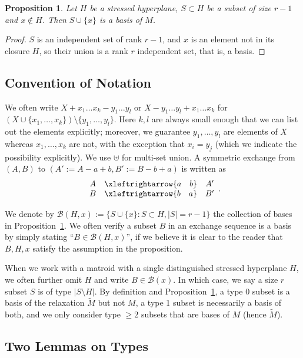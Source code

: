 \documentclass{amsart}
\newtheorem{proposition}[theorem]{Proposition}
\newcommand{\swap}[2]{\xleftrightarrow{#1 \quad #2}}
\newcommand\Bcal{{\mathcal B}}
\begin{document}
\begin{proposition} \label{prop:type1}
    Let $H$ be a stressed hyperplane, $S\subset H$ be a subset of size $r-1$ and $x\not\in H$. Then $S\cup \{x\}$ is a basis of $M$.
\end{proposition}

\begin{proof}
    $S$ is an independent set of rank $r-1$, and $x$ is an element not in its closure $H$, so their union is a rank $r$ independent set, that is, a basis.
\end{proof}

\subsection{Convention of Notation}

We often write $X+ x_1\ldots x_k-y_1\ldots y_l$ or $X-y_1\ldots y_l+x_1\ldots x_k$ for $(X\cup\{x_1,\ldots,x_k\})\setminus\{y_1,\ldots,y_l\}$. Here $k,l$ are always small enough that we can list out the elements explicitly; moreover, we guarantee $y_1,\ldots,y_l$ are elements of $X$ whereas $x_1,\ldots,x_k$ are not, with the exception that $x_i=y_j$ (which we indicate the possibility explicitly). We use $\uplus$ for multi-set union.
A symmetric exchange from $(A,B)$ to $(A':=A-a+b,B':=B-b+a)$ is written as
$$
\begin{array}{c c c}
   A   & \swap{a}{b} & A'\\
   B   & \swap{b}{a} & B'
\end{array}.
$$

We denote by $\Bcal(H,x):=\{S\cup\{x\}:S\subset H, |S|=r-1\}$ the collection of bases in Proposition~\ref{prop:type1}. We often verify a subset $B$ in an exchange sequence is a basis by simply stating ``$B\in\Bcal(H,x)$'', if we believe it is clear to the reader that $B,H,x$ satisfy the assumption in the proposition.

When we work with a matroid with a single distinguished stressed hyperplane $H$, we often further omit $H$ and write $B\in\Bcal(x)$. In which case, we say a size $r$ subset $S$ is of type $|S\setminus H|$. By definition and Proposition~\ref{prop:type1}, a type 0 subset is a basis of the relaxation $\widetilde{M}$ but not $M$, a type 1 subset is necessarily a basis of both, and we only consider type $\geq 2$ subsets that are bases of $M$ (hence $\widetilde{M}$).

\subsection{Two Lemmas on Types}
\end{document}

